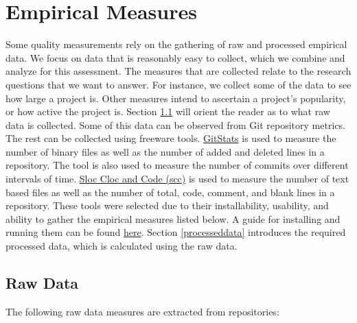 \documentclass[letterpaper,cleveref]{lipics-v2019}
\theoremstyle{definition}
\begin{document}
\section{Empirical Measures} \label{SecEmpiricalMeasures}
Some quality measurements rely on the gathering of raw and processed empirical data. We focus on data that is reasonably easy to collect, which we combine and analyze for this assessment. The measures that are collected relate to the research questions that we want to answer. For instance, we collect some of the data to see how large a project is. Other measures intend to ascertain a project’s popularity, or how active the project is.
Section \ref{rawdata} will orient the reader as to what raw data is collected. 
Some of this data can be observed from Git repository metrics. The rest can be collected using freeware tools. \href{https://github.com/tomgi/git_stats}{GitStats} is used to measure the number of binary files as well as the number of added and deleted lines in a repository. The tool is also used to measure the number of commits over different intervals of time. \href{https://github.com/boyter/scc}{Sloc Cloc and Code (scc)} is used to measure the number of text based files as well as the number of total, code, comment, and blank lines in a repository. These tools were selected due to their installability, usability, and ability to gather the empirical measures listed below. A guide for installing and running them can be found \href{https://github.com/smiths/AIMSS/blob/master/StateOfPractice/Methodology/A Guide to Empirical Measures.pdf}{here}. Section \ref{processeddata} introduces the required processed data, which is calculated using the raw data.

\subsection{Raw Data}\label{rawdata}
The following raw data measures are extracted from repositories:
\end{document}
